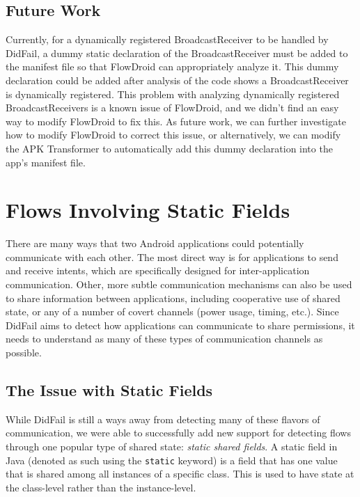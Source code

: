 \section{Future Work}
Currently, for a dynamically registered BroadcastReceiver to be handled by DidFail, a dummy static declaration of the BroadcastReceiver must be added to the manifest file so that FlowDroid can appropriately analyze it. This dummy declaration could be added after analysis of the code shows a BroadcastReceiver is dynamically registered. This problem with analyzing dynamically registered BroadcastReceivers is a known issue of FlowDroid, and we didn't find an easy way to modify FlowDroid to fix this. As future work, we can further investigate how to modify FlowDroid to correct this issue, or alternatively, we can modify the APK Transformer to automatically add this dummy declaration into the app's manifest file.


\newpage
{}
\chapter{Flows Involving Static Fields} \label{chap:static_fields}

There are many ways that two Android applications could potentially communicate with each other. The most direct way is for applications to send and receive intents, which are specifically designed for inter-application communication. Other, more subtle communication mechanisms can also be used to share information between applications, including cooperative use of shared state, or any of a number of covert channels (power usage, timing, etc.). Since DidFail aims to detect how applications can communicate to share permissions, it needs to understand as many of these types of communication channels as possible.

\section{The Issue with Static Fields}

While DidFail is still a ways away from detecting many of these flavors of communication, we were able to successfully add new support for detecting flows through one popular type of shared state: \emph{static shared fields}. A static field in Java (denoted as such using the \texttt{static} keyword) is a field that has one value that is shared among all instances of a specific class. This is used to have state at the class-level rather than the instance-level.


